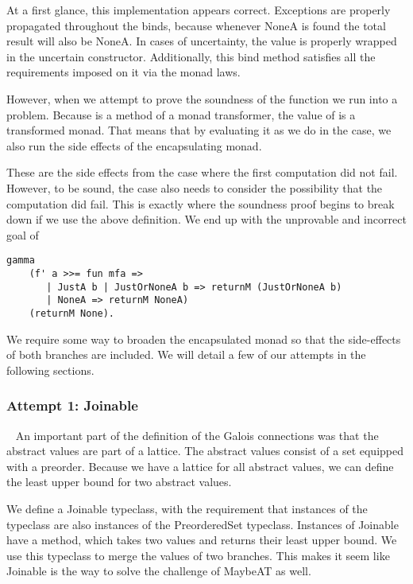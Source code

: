 At a first glance, this implementation appears correct. Exceptions are properly
propagated throughout the binds, because whenever NoneA is found the total
result will also be NoneA. In cases of uncertainty, the value is properly
wrapped in the uncertain  constructor. Additionally, this bind
method satisfies all the requirements imposed on it via the monad laws.

However, when we attempt to prove the soundness of the function we run into a
problem. Because  is a method of a monad transformer, the
value of  is a transformed monad. That means that by evaluating it as
we do in the  case, we also run the side effects of the
encapsulating monad. 

These are the side effects from the case where the first computation did not 
fail. However, to be sound, the  case also needs to consider
the possibility that the computation did fail. This is exactly where the
soundness proof begins to break down if we use the above definition. We end up
with the unprovable and incorrect goal of 

\begin{verbatim}
gamma 
    (f' a >>= fun mfa => 
       | JustA b | JustOrNoneA b => returnM (JustOrNoneA b) 
       | NoneA => returnM NoneA) 
    (returnM None).
\end{verbatim}

We require some way to broaden the encapsulated monad so that the side-effects of
both branches are included. We will detail a few of our attempts in the
following sections.

\subsubsection{Attempt 1: Joinable}~\label{sec:maybeat_join}
An important part of the definition of the Galois connections was that the
abstract values are part of a lattice. The abstract values consist of a set
equipped with a preorder. Because we have a lattice for all abstract values, we
can define the least upper bound for two abstract values.

We define a Joinable typeclass, with the requirement that instances of the
typeclass are also instances of the PreorderedSet typeclass. Instances of
Joinable have a  method, which takes two values and returns their
least upper bound. We use this typeclass to merge the values of two branches.
This makes it seem like Joinable is the way to solve the challenge of MaybeAT
as well.

